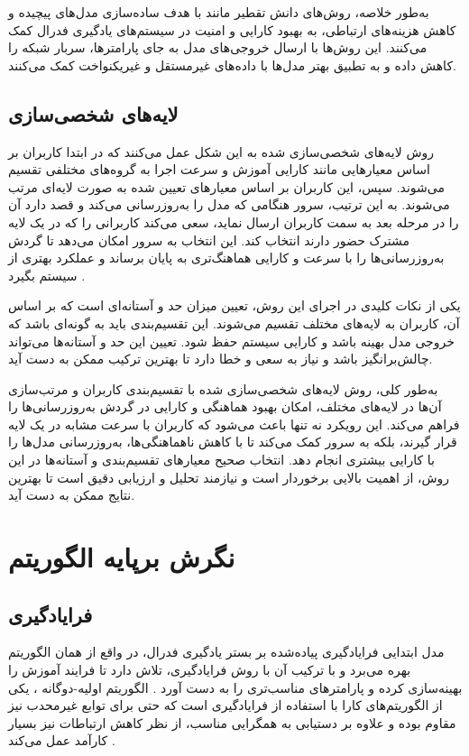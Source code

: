 به‌طور خلاصه، روش‌های دانش تقطیر مانند
با هدف ساده‌سازی مدل‌های پیچیده و کاهش هزینه‌های ارتباطی، به بهبود کارایی و امنیت در سیستم‌های یادگیری فدرال کمک می‌کنند. این روش‌ها با ارسال خروجی‌های مدل به جای پارامترها، سربار شبکه را کاهش داده و به تطبیق بهتر مدل‌ها با داده‌های غیرمستقل و غیریکنواخت کمک می‌کنند.


\subsection{
	لایه‌های شخصی‌سازی%
}
روش لایه‌های شخصی‌سازی شده به این شکل عمل می‌کنند که در ابتدا کاربران بر اساس معیارهایی مانند کارایی آموزش و سرعت اجرا به گروه‌های مختلفی تقسیم می‌شوند. سپس، این کاربران بر اساس معیارهای تعیین شده به صورت لایه‌ای مرتب می‌شوند. به این ترتیب، سرور هنگامی که مدل را به‌روزرسانی می‌کند و قصد دارد آن را در مرحله بعد به سمت کاربران ارسال نماید، سعی می‌کند کاربرانی را که در یک لایه مشترک حضور دارند انتخاب کند. این انتخاب به سرور امکان می‌دهد تا گردش به‌روزرسانی‌ها را با سرعت و کارایی هماهنگ‌تری به پایان برساند و عملکرد بهتری از سیستم بگیرد
\cite{chai2020tifl}.

یکی از نکات کلیدی در اجرای این روش، تعیین میزان حد و آستانه‌ای است که بر اساس آن، کاربران به لایه‌های مختلف تقسیم می‌شوند. این تقسیم‌بندی باید به گونه‌ای باشد که خروجی مدل بهینه باشد و کارایی سیستم حفظ شود. تعیین این حد و آستانه‌ها می‌تواند چالش‌برانگیز باشد و نیاز به سعی و خطا دارد تا بهترین ترکیب ممکن به دست آید.

به‌طور کلی، روش لایه‌های شخصی‌سازی شده با تقسیم‌بندی کاربران و مرتب‌سازی آن‌ها در لایه‌های مختلف، امکان بهبود هماهنگی و کارایی در گردش به‌روزرسانی‌ها را فراهم می‌کند. این رویکرد نه تنها باعث می‌شود که کاربران با سرعت مشابه در یک لایه قرار گیرند، بلکه به سرور کمک می‌کند تا با کاهش ناهماهنگی‌ها، به‌روزرسانی مدل‌ها را با کارایی بیشتری انجام دهد. انتخاب صحیح معیارهای تقسیم‌بندی و آستانه‌ها در این روش، از اهمیت بالایی برخوردار است و نیازمند تحلیل و ارزیابی دقیق است تا بهترین نتایج ممکن به دست آید.




\section{نگرش برپایه الگوریتم}
\subsection{فرایادگیری}
مدل ابتدایی فرایادگیری پیاده‌شده بر بستر یادگیری فدرال، در واقع از همان الگوریتم
بهره می‌برد و با ترکیب آن با روش فرایادگیری، تلاش دارد تا فرایند آموزش را بهینه‌سازی کرده و پارامترهای مناسب‌تری را به دست آورد
\cite{jiang2019improving}.
الگوریتم اولیه-دوگانه%
%
، یکی از الگوریتم‌های کارا با استفاده از فرایادگیری است که حتی برای توابع غیرمحدب نیز مقاوم بوده و علاوه بر دستیابی به همگرایی مناسب، از نظر کاهش ارتباطات نیز بسیار کارآمد عمل می‌کند
\cite{zhang2021fedpd}.

